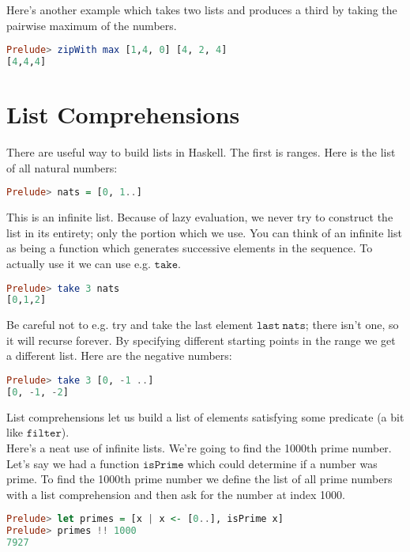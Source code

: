 \documentclass[a4paper,12pt]{article}
\newcommand{\kwa}[1]{\mathtt{#1}}
\begin{document}
\noindent
Here's another example which takes two lists and produces a third by taking the pairwise maximum of the numbers.

\begin{lstlisting}[language=Haskell]
Prelude> zipWith max [1,4, 0] [4, 2, 4]
[4,4,4]
\end{lstlisting}

\section{List Comprehensions}

\noindent
There are useful way to build lists in Haskell. The first is ranges. Here is the list of all natural numbers:

\begin{lstlisting}[language=Haskell]
Prelude> nats = [0, 1..]
\end{lstlisting}

\noindent
This is an infinite list. Because of lazy evaluation, we never try to construct the list in its entirety; only the portion which we use. You can think of an infinite list as being a function which generates successive elements in the sequence. To actually use it we can use e.g. $\kwa{take}$.

\begin{lstlisting}[language=Haskell]
Prelude> take 3 nats
[0,1,2]
\end{lstlisting}

\noindent
Be careful not to e.g. try and take the last element $\kwa{last~nats}$; there isn't one, so it will recurse forever. By specifying different starting points in the range we get a different list. Here are the negative numbers:

\begin{lstlisting}[language=Haskell]
Prelude> take 3 [0, -1 ..]
[0, -1, -2]
\end{lstlisting}

\noindent
List comprehensions let us build a list of elements satisfying some predicate (a bit like $\kwa{filter}$). \\

\noindent
Here's a neat use of infinite lists. We're going to find the 1000th prime number. Let's say we had a function $\kwa{isPrime}$ which could determine if a number was prime. To find the 1000th prime number we define the list of all prime numbers with a list comprehension and then ask for the number at index 1000.

\begin{lstlisting}[language=Haskell]
Prelude> let primes = [x | x <- [0..], isPrime x]
Prelude> primes !! 1000
7927
\end{lstlisting}
\end{document}
